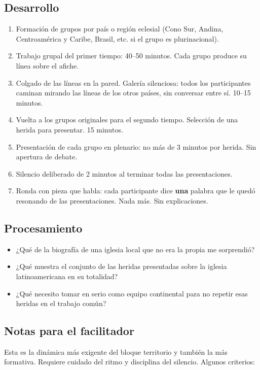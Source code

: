 \documentclass[11pt, a4paper]{article}
\begin{document}
\begin{actividad}
\subsection*{Desarrollo}
\begin{enumerate}[label={\arabic*.}]
  \item Formación de grupos por país o región eclesial (Cono Sur, Andina, Centroamérica y Caribe, Brasil, etc. si el grupo es plurinacional).
  \item Trabajo grupal del primer tiempo: 40--50 minutos. Cada grupo produce su línea sobre el afiche.
  \item Colgado de las líneas en la pared. Galería silenciosa: todos los participantes caminan mirando las líneas de los otros países, sin conversar entre sí. 10--15 minutos.
  \item Vuelta a los grupos originales para el segundo tiempo. Selección de una herida para presentar. 15 minutos.
  \item Presentación de cada grupo en plenario: no más de 3 minutos por herida. Sin apertura de debate.
  \item Silencio deliberado de 2 minutos al terminar todas las presentaciones.
  \item Ronda con pieza que habla: cada participante dice \textbf{una} palabra que le quedó resonando de las presentaciones. Nada más. Sin explicaciones.
\end{enumerate}

\subsection*{Procesamiento}
\begin{itemize}
  \item ¿Qué de la biografía de una iglesia local que no era la propia me sorprendió?
  \item ¿Qué muestra el conjunto de las heridas presentadas sobre la iglesia latinoamericana en su totalidad?
  \item ¿Qué necesito tomar en serio como equipo continental para no repetir esas heridas en el trabajo común?
\end{itemize}

\subsection*{Notas para el facilitador}
Esta es la dinámica más exigente del bloque territorio y también la más formativa. Requiere cuidado del ritmo y disciplina del silencio. Algunos criterios:


\end{actividad}
\end{document}
